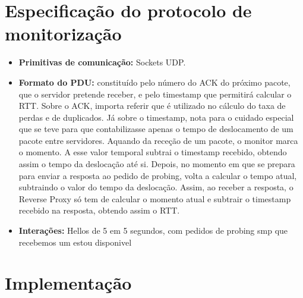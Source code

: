\documentclass{llncs}
\begin{document}
\section{Especificação do protocolo de monitorização}

\begin{itemize}
	\setlength\itemsep{1em}
\item \textbf{Primitivas de comunicação:} Sockets UDP.
\item \textbf{Formato do PDU:} constituído pelo número do ACK do próximo pacote, que o servidor pretende receber, e pelo timestamp que permitirá calcular o RTT. Sobre o ACK, importa referir que é utilizado no cálculo do taxa de perdas e de duplicados. Já sobre o timestamp, nota para o cuidado especial que se teve para que contabilizasse apenas o tempo de deslocamento de um pacote entre servidores. Aquando da receção de um pacote, o monitor marca o momento. A esse valor temporal subtrai o timestamp recebido, obtendo assim o tempo da deslocação até si. Depois, no momento em que se prepara para enviar a resposta ao pedido de probing, volta a calcular o tempo atual, subtraindo o valor do tempo da deslocação. Assim, ao receber a resposta, o Reverse Proxy só tem de calcular o momento atual e subtrair o timestamp recebido na resposta, obtendo assim o RTT.
\item \textbf{Interações:} Hellos de 5 em 5 segundos, com pedidos de probing smp que recebemos um estou disponivel
\end{itemize}

\newpage

\section{Implementação}
\end{document}
